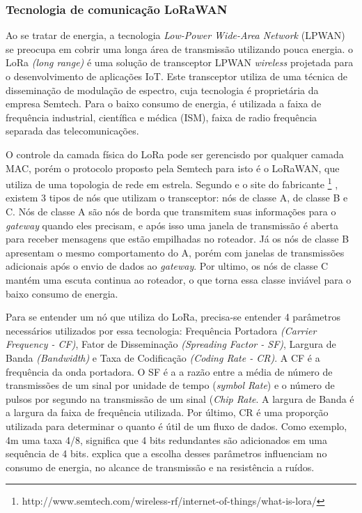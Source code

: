 \documentclass[
    hidelinks,
	12pt,				%
	openany,
	oneside, 
	a4paper,			%
	english,			%
	french,				%
	spanish,			%
	brazil				%
	]{abntex2}
\begin{document}
\subsubsection{Tecnologia de comunicação LoRaWAN}\label{lorawan}

Ao se tratar de energia, a tecnologia \textit{Low-Power Wide-Area Network} (LPWAN) se preocupa em cobrir uma longa área de transmissão utilizando pouca energia. o LoRa \textit{(long range)} é uma solução de transceptor LPWAN \textit{wireless} projetada para o desenvolvimento de aplicações IoT. Este transceptor utiliza de uma técnica de disseminação de modulação de espectro, cuja tecnologia é proprietária da empresa Semtech. Para o baixo consumo de energia, é utilizada a faixa de frequência industrial, científica e médica (ISM), faixa de radio frequência separada das telecomunicações.

O controle da camada física do LoRa pode ser gerencisdo por qualquer camada MAC, porém o protocolo proposto pela Semtech para isto é o LoRaWAN, que utiliza de uma topologia de rede em estrela. Segundo \cite{Bor:2016:LIT:2893711.2893802} e o site do fabricante \footnote{http://www.semtech.com/wireless-rf/internet-of-things/what-is-lora/} , existem 3 tipos de nós que utilizam o transceptor: nós de classe A, de classe B e C. Nós de classe A são nós de borda que transmitem suas informações para o \textit{gateway} quando eles precisam, e após isso uma janela de transmissão é aberta para receber mensagens que estão empilhadas no roteador. Já os nós de classe B apresentam o mesmo comportamento do A, porém com janelas de transmissões adicionais após o envio de dados ao \textit{gateway}. Por ultimo, os nós de classe C mantém uma escuta continua ao roteador, o que torna essa classe inviável para o baixo consumo de energia.

Para se entender um nó que utiliza do LoRa, precisa-se entender 4 parâmetros necessários utilizados por essa tecnologia: Frequência  Portadora \textit{(Carrier Frequency - CF)}, Fator de Disseminação \textit{(Spreading Factor - SF)}, Largura de Banda \textit{(Bandwidth)} e Taxa de Codificação \textit{(Coding Rate - CR)}. A CF é a frequência  da onda portadora. O SF é a a razão entre a média de número de transmissões de um sinal por unidade de tempo (\textit{symbol Rate}) e o número de pulsos por segundo na transmissão de um sinal (\textit{Chip Rate}. A largura de Banda é a largura da faixa de frequência utilizada. Por último, CR é uma proporção utilizada para determinar o quanto é útil de um fluxo de dados. Como exemplo, 4m uma taxa 4/8, significa que 4 bits redundantes são adicionados em uma sequência de 4 bits. \citeauthor{Bor:2016:LIT:2893711.2893802} explica que a escolha desses parâmetros influenciam no consumo de energia, no alcance de transmissão e na resistência a ruídos.
\end{document}
